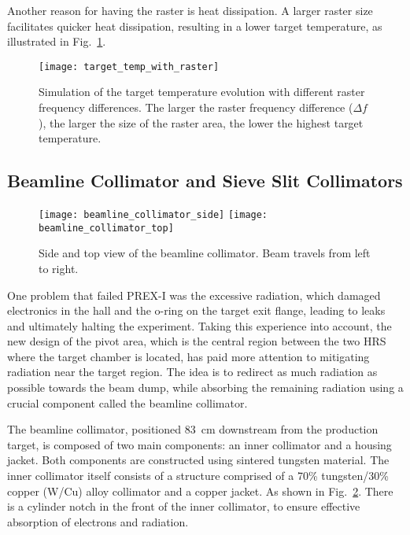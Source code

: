 Another reason for having the raster is heat dissipation. A larger raster size
facilitates quicker heat dissipation, resulting in a lower target temperature,
as illustrated in Fig.~\ref{fig:target_temp_with_raster}.
\begin{figure}
    \centering
    \texttt{[image: target\_temp\_with\_raster]}
    \caption[Target temperature]
    {Simulation of the target temperature evolution with different raster frequency
    differences. The larger the raster frequency difference ($\Delta f$), the larger
    the size of the raster area, the lower the highest target temperature.}
    \label{fig:target_temp_with_raster}
\end{figure}

\subsection{Beamline Collimator and Sieve Slit Collimators}
\begin{figure}[!h]
    \centering
    \texttt{[image: beamline\_collimator\_side]}
    \hspace{1 cm}
    \texttt{[image: beamline\_collimator\_top]}
    \caption[beamline collimator]
    {Side and top view of the beamline collimator. Beam travels from left to right.}
    \label{fig:beamline_collimator}
\end{figure}

One problem that failed PREX-I was the excessive radiation, which damaged
electronics in the hall and the o-ring on the target exit flange, leading to
leaks and ultimately halting the experiment.
Taking this experience into account, the new design of the pivot area,
which is the central region between the two HRS where the target chamber is located,
has paid more attention to mitigating radiation near the target region. 
The idea is to redirect as much radiation as possible towards the beam dump, 
while absorbing the remaining radiation using a crucial component called
the beamline collimator. 

The beamline collimator, positioned 83~cm downstream from the production 
target, is composed of two main components: an inner collimator and a housing
jacket. Both components are constructed using sintered tungsten material. The inner collimator itself consists of a structure comprised of a 70\% tungsten/30\% copper (W/Cu) alloy collimator and a copper jacket. As shown in Fig.~\ref{fig:beamline_collimator}. There is a cylinder notch in the front of
the inner collimator, to ensure effective absorption of electrons and radiation.

